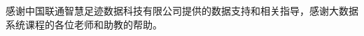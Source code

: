 \documentclass[
11pt, %
english, %
singlespacing, %
headsepline, %
]{MastersDoctoralThesis} %
\begin{document}

\begin{acknowledgements}
\addchaptertocentry{\acknowledgementname} %
感谢中国联通智慧足迹数据科技有限公司提供的数据支持和相关指导，感谢大数据系统课程的各位老师和助教的帮助。
\end{acknowledgements}


\tableofcontents %

\listoffigures %

\listoftables %



\mainmatter %

\pagestyle{thesis} %



 

 
% 


\appendix %



%
%




\end{document}
